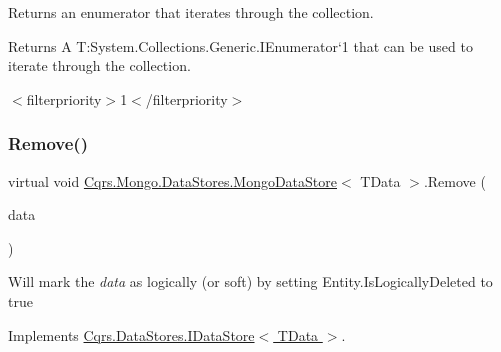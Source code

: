 Returns an enumerator that iterates through the collection. 

\begin{DoxyReturn}{Returns}
A T\+:\+System.\+Collections.\+Generic.\+I\+Enumerator`1 that can be used to iterate through the collection. 
\end{DoxyReturn}
$<$filterpriority$>$1$<$/filterpriority$>$ \mbox{\label{classCqrs_1_1Mongo_1_1DataStores_1_1MongoDataStore_a64003d01de3ac6ffd0e41bb7f572bf96_a64003d01de3ac6ffd0e41bb7f572bf96}} 
\subsubsection{\texorpdfstring{Remove()}{Remove()}}
{\footnotesize\ttfamily virtual void \hyperlink{classCqrs_1_1Mongo_1_1DataStores_1_1MongoDataStore}{Cqrs.\+Mongo.\+Data\+Stores.\+Mongo\+Data\+Store}$<$ T\+Data $>$.Remove (\begin{DoxyParamCaption}\item[{T\+Data}]{data }\end{DoxyParamCaption})\hspace{0.3cm}{\ttfamily [virtual]}}



Will mark the {\itshape data}  as logically (or soft) by setting Entity.\+Is\+Logically\+Deleted to true 



Implements \hyperlink{interfaceCqrs_1_1DataStores_1_1IDataStore_a7ef540796bbe4257296841590bc23478_a7ef540796bbe4257296841590bc23478}{Cqrs.\+Data\+Stores.\+I\+Data\+Store$<$ T\+Data $>$}.

\mbox{\label{classCqrs_1_1Mongo_1_1DataStores_1_1MongoDataStore_a878966ea796321cae54c3c619e3178d5_a878966ea796321cae54c3c619e3178d5}} 
